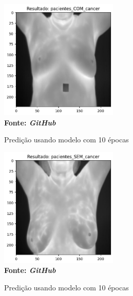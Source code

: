 \begin{figure}[ht]
 	\centering	
 	\caption[\hspace{0.1cm}Grade Computacional.]{Predição usando modelo com 10 épocas}
 	\vspace{-0.4cm}
 	\includegraphics[width=0.5\textwidth]{figuras/model10_pred1.png}
 	\captionsetup{justification=centering}
	\vspace{-0.2cm}
     \\\textbf{\footnotesize Fonte: \textit{GitHub}}
	\label{fig:predicao1}
\end{figure}

\begin{figure}[ht]
 	\centering	
 	\caption[\hspace{0.1cm}Grade Computacional.]{Predição usando modelo com 10 épocas}
 	\vspace{-0.4cm}
 	\includegraphics[width=0.5\textwidth]{figuras/model10_pred2.png}
 	\captionsetup{justification=centering}
	\vspace{-0.2cm}
     \\\textbf{\footnotesize Fonte: \textit{GitHub}}
	\label{fig:predicao2}
\end{figure}




